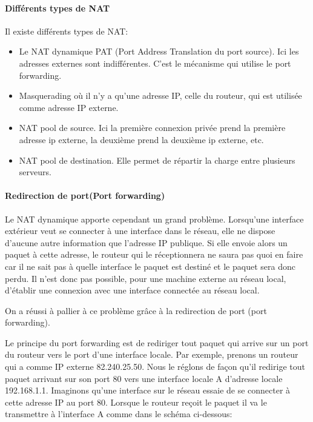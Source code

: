 \paragraph{Différents types de NAT}

Il existe différents types de NAT:
\begin{itemize}
\item Le NAT dynamique PAT (Port Address Translation du port source). Ici les
adresses externes sont indifférentes. C'est le mécanisme qui utilise le port forwarding.
\item Masquerading où il n'y a qu'une adresse IP, celle du routeur, qui est
utilisée comme adresse IP externe.
\item NAT pool de source. Ici la première connexion privée prend la première
adresse ip externe, la deuxième prend la deuxième ip externe, etc.
\item NAT pool de destination. Elle permet de répartir la charge entre plusieurs
serveurs.
\end{itemize}


\paragraph{Redirection de port(Port forwarding)}

Le NAT dynamique apporte cependant un grand problème. Lorsqu'une interface
extérieur veut se connecter à une interface dans le réseau, elle ne dispose
d'aucune autre information que l'adresse IP publique. Si elle envoie alors un
paquet à cette adresse, le routeur qui le réceptionnera ne saura pas quoi en
faire car il ne sait pas à quelle interface le paquet est destiné et le paquet sera
donc perdu. Il n'est donc pas possible, pour une machine externe au réseau local, d'établir 
une connexion avec une interface connectée au réseau local.

On a réussi à pallier à ce problème grâce à la redirection de port (port 
forwarding). 

Le principe du port forwarding est de rediriger tout paquet qui arrive sur un
port du routeur vers le port d'une interface locale.
Par exemple, prenons un routeur qui a comme IP externe 82.240.25.50.
Nous le réglons de façon qu'il redirige tout paquet arrivant sur son port 80
vers une interface locale A d'adresse locale 192.168.1.1.
Imaginons qu'une interface sur le réseau essaie de se connecter à cette adresse
 IP au port 80.
Lorsque le routeur reçoit le paquet il va le transmettre à l'interface A comme
dans le schéma ci-dessous:

